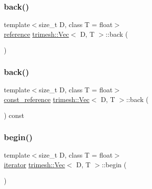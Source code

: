 \mbox{\label{classtrimesh_1_1Vec_a7e0db712c8f0363fb640d2da0815c2b0}} 
\subsubsection{\texorpdfstring{back()}{back()}\hspace{0.1cm}{\footnotesize\ttfamily [1/2]}}
{\footnotesize\ttfamily template$<$size\+\_\+t D, class T = float$>$ \\
\hyperlink{classtrimesh_1_1Vec_ad76bb92c986524d251998d6eae7d2825}{reference} \hyperlink{classtrimesh_1_1Vec}{trimesh\+::\+Vec}$<$ D, T $>$\+::back (\begin{DoxyParamCaption}{ }\end{DoxyParamCaption})\hspace{0.3cm}{\ttfamily [inline]}}

\mbox{\label{classtrimesh_1_1Vec_ab916bae8186944cb0fe925d33ad93300}} 
\subsubsection{\texorpdfstring{back()}{back()}\hspace{0.1cm}{\footnotesize\ttfamily [2/2]}}
{\footnotesize\ttfamily template$<$size\+\_\+t D, class T = float$>$ \\
\hyperlink{classtrimesh_1_1Vec_a5ae45a41f93e04534f46b74dee5c6701}{const\+\_\+reference} \hyperlink{classtrimesh_1_1Vec}{trimesh\+::\+Vec}$<$ D, T $>$\+::back (\begin{DoxyParamCaption}{ }\end{DoxyParamCaption}) const\hspace{0.3cm}{\ttfamily [inline]}}

\mbox{\label{classtrimesh_1_1Vec_a7600fd9789e1560e2264339327350550}} 
\subsubsection{\texorpdfstring{begin()}{begin()}\hspace{0.1cm}{\footnotesize\ttfamily [1/2]}}
{\footnotesize\ttfamily template$<$size\+\_\+t D, class T = float$>$ \\
\hyperlink{classtrimesh_1_1Vec_ae21cfb5c00b53dc906ddc4f939ca8d22}{iterator} \hyperlink{classtrimesh_1_1Vec}{trimesh\+::\+Vec}$<$ D, T $>$\+::begin (\begin{DoxyParamCaption}{ }\end{DoxyParamCaption})\hspace{0.3cm}{\ttfamily [inline]}}


